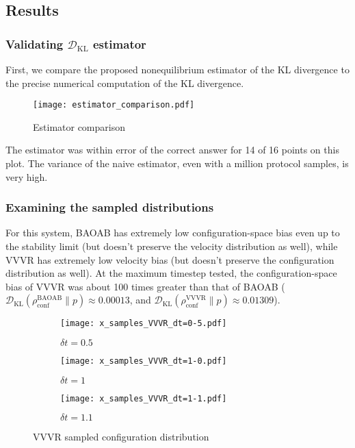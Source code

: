 \documentclass[11pt]{article}
\newcommand{\kldiv}{\mathcal{D}_\text{KL}}
\newcommand{\conf}{\rho_\text{conf}}
\begin{document}
\subsection{Results}

\subsubsection{Validating $\kldiv$ estimator}
First, we compare the proposed nonequilibrium estimator of the KL divergence to the precise numerical computation of the KL divergence.

\begin{figure}[h]
	\centering
	\texttt{[image: estimator\_comparison.pdf]}
	\caption{Estimator comparison}
\end{figure}

The estimator was within error of the correct answer for 14 of 16 points on this plot.
The variance of the naive estimator, even with a million protocol samples, is very high.

\subsubsection{Examining the sampled distributions}
For this system, BAOAB has extremely low configuration-space bias even up to the stability limit (but doesn't preserve the velocity distribution as well), while VVVR has extremely low velocity bias (but doesn't preserve the configuration distribution as well).
At the maximum timestep tested, the configuration-space bias of VVVR was about 100 times greater than that of BAOAB ($\kldiv(\conf^\text{BAOAB} \| p) \approx 0.00013$, and $\kldiv(\conf^\text{VVVR} \| p) \approx 0.01309$).

\begin{figure}[H] %
    \centering
    \begin{subfigure}[b]{0.3\textwidth}
        \texttt{[image: x\_samples\_VVVR\_dt=0-5.pdf]}
        \caption{$\delta t = 0.5$}
    \end{subfigure}
    \begin{subfigure}[b]{0.3\textwidth}
        \texttt{[image: x\_samples\_VVVR\_dt=1-0.pdf]}
        \caption{$\delta t = 1$}
    \end{subfigure}
    \begin{subfigure}[b]{0.3\textwidth}
        \texttt{[image: x\_samples\_VVVR\_dt=1-1.pdf]}
        \caption{$\delta t = 1.1$}
    \end{subfigure}
    \caption{VVVR sampled configuration distribution}
\end{figure}
\end{document}
